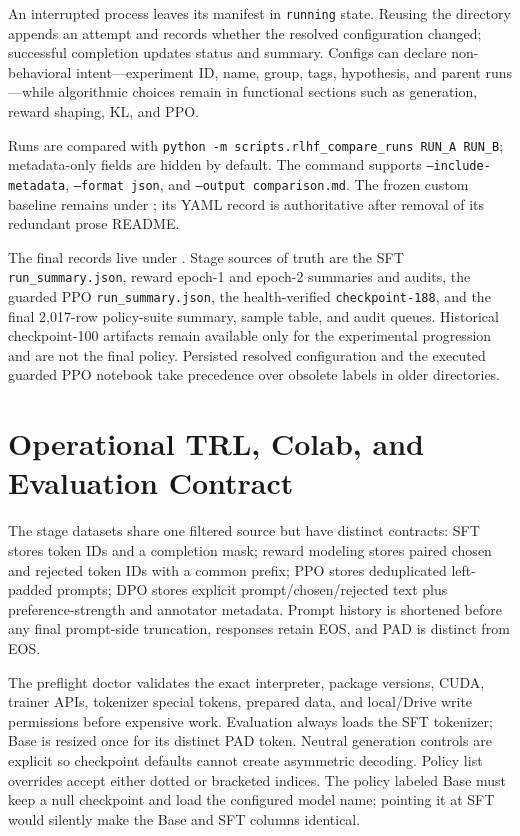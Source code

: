 \documentclass[11pt]{article}
\begin{document}
An interrupted process leaves its manifest in \texttt{running} state.
Reusing the directory appends an attempt and records whether the resolved
configuration changed; successful completion updates status and summary.
Configs can declare non-behavioral intent---experiment ID, name, group, tags,
hypothesis, and parent runs---while algorithmic choices remain in functional
sections such as generation, reward shaping, KL, and PPO.

Runs are compared with
\texttt{python -m scripts.rlhf\_compare\_runs RUN\_A RUN\_B}; metadata-only
fields are hidden by default. The command supports \texttt{--include-metadata},
\texttt{--format json}, and \texttt{--output comparison.md}. The
frozen custom baseline remains under
; its YAML
record is authoritative after removal of its redundant prose README.

The final records live under
. Stage sources of
truth are the SFT \texttt{run\_summary.json}, reward epoch-1 and epoch-2
summaries and audits, the guarded PPO \texttt{run\_summary.json}, the
health-verified \texttt{checkpoint-188}, and the final 2,017-row policy-suite
summary, sample table, and audit queues. Historical checkpoint-100 artifacts
remain available only for the experimental progression and are not the final
policy. Persisted resolved configuration and the executed guarded PPO notebook
take precedence over obsolete labels in older directories.

\section{Operational TRL, Colab, and Evaluation Contract}

The stage datasets share one filtered source but have distinct contracts: SFT
stores token IDs and a completion mask; reward modeling stores paired chosen
and rejected token IDs with a common prefix; PPO stores deduplicated
left-padded prompts; DPO stores explicit prompt/chosen/rejected text plus
preference-strength and annotator metadata. Prompt history is shortened before
any final prompt-side truncation, responses retain EOS, and PAD is distinct
from EOS.

The preflight doctor validates the exact interpreter, package versions, CUDA,
trainer APIs, tokenizer special tokens, prepared data, and local/Drive write
permissions before expensive work. Evaluation always loads the SFT tokenizer;
Base is resized once for its distinct PAD token. Neutral generation controls
are explicit so checkpoint defaults cannot create asymmetric decoding. Policy
list overrides accept either dotted or bracketed indices. The policy labeled
Base must keep a null checkpoint and load the configured model name; pointing
it at SFT would silently make the Base and SFT columns identical.
\end{document}
